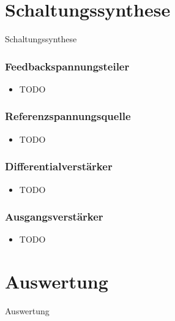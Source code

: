 \documentclass[aspectratio=32]{beamer}
\begin{document}
\section{Schaltungssynthese}
{
  \logo{}
  \begin{frame}
    \centering
    \Large{Schaltungssynthese}
  \end{frame}
}

\begin{frame}
  \frametitle{Feedbackspannungsteiler}
  \centering
  \begin{itemize}
    \item TODO
  \end{itemize}
\end{frame}

\begin{frame}
  \frametitle{Referenzspannungsquelle}
  \centering
  \begin{itemize}
    \item TODO
  \end{itemize}
\end{frame}

\begin{frame}
  \frametitle{Differentialverstärker}
  \centering
  \begin{itemize}
    \item TODO
  \end{itemize}
\end{frame}

\begin{frame}
  \frametitle{Ausgangsverstärker}
  \centering
  \begin{itemize}
    \item TODO
  \end{itemize}
\end{frame}

\section{Auswertung}
{
  \logo{}
  \begin{frame}
    \centering
    \Large{Auswertung}
  \end{frame}
}
\end{document}

